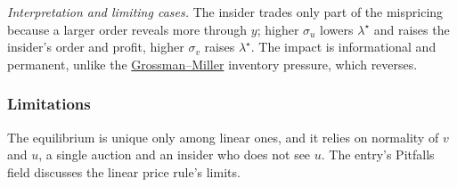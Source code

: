 \emph{Interpretation and limiting cases.} The insider trades only part of the mispricing because a larger order reveals more through $y$; higher $\sigma_u$ lowers $\lambda^\star$ and raises the insider's order and profit, higher $\sigma_v$ raises $\lambda^\star$. The impact is informational and permanent, unlike the \hyperref[drv:grossman-miller]{Grossman--Miller} inventory pressure, which reverses.

\subsubsection{Limitations}
The equilibrium is unique only among linear ones, and it relies on normality of $v$ and $u$, a single auction and an insider who does not see $u$. The entry's Pitfalls field discusses the linear price rule's limits.
